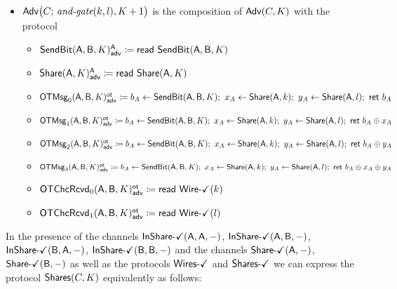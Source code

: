 \begin{itemize}
\item $\Adv\big(C; \, \andgate(k,l),K+1\big)$ is the composition of $\Adv(C,K)$ with the protocol
\begin{itemize}
\item {\color{blue} $\LeakSendBit(\A,\B,K)^\A_\adv \coloneqq \read{\SendBit(\A,\B,K)}$}
\item {\color{blue} $\LeakShare(\A,K)^\A_\adv \coloneqq \read{\Share(\A,K)}$}\smallskip
\item {\color{blue} $\LeakOTMsg_0(\A,\B,K)^\ot_\adv \coloneqq b_A \leftarrow \SendBit(\A,\B,K); \ x_A \leftarrow \Share(\A,k); \ y_A \leftarrow \Share(\A,l); \ \ret{b_A}$}
\item {\color{blue} $\LeakOTMsg_1(\A,\B,K)^\ot_\adv \coloneqq b_A \leftarrow \SendBit(\A,\B,K); \ x_A \leftarrow \Share(\A,k); \ y_A \leftarrow \Share(\A,l); \ \ret{b_A \oplus x_A}$}
\item {\color{blue} $\LeakOTMsg_2(\A,\B,K)^\ot_\adv \coloneqq b_A \leftarrow \SendBit(\A,\B,K); \ x_A \leftarrow \Share(\A,k); \ y_A \leftarrow \Share(\A,l); \ \ret{b_A \oplus y_A}$}
\item {\color{blue} $\LeakOTMsg_3(\A,\B,K)^\ot_\adv \coloneqq b_A \leftarrow \SendBit(\A,\B,K); \ x_A \leftarrow \Share(\A,k); \ y_A \leftarrow \Share(\A,l); \ \ret{b_A \oplus x_A \oplus y_A}$}\smallskip
\item {\color{blue} $\LeakOTChcRcvd_0(\A,\B,K)^\ot_\adv \coloneqq \read{\WireOk(k)}$}
\item {\color{blue} $\LeakOTChcRcvd_1(\A,\B,K)^\ot_\adv \coloneqq \read{\WireOk(l)}$}
\end{itemize}
\end{itemize}

\noindent In the presence of the channels $\InShareOk(\A,\A,-)$, $\InShareOk(\A,\B,-)$, $\InShareOk(\B,\A,-)$, $\InShareOk(\B,\B,-)$ and the channels $\ShareOk(\A,-)$, $\ShareOk(\B,-)$ as well as the protocols $\WiresOk$ and $\SharesOk$ we can express the protocol $\Shares(C,K)$ equivalently as follows:


